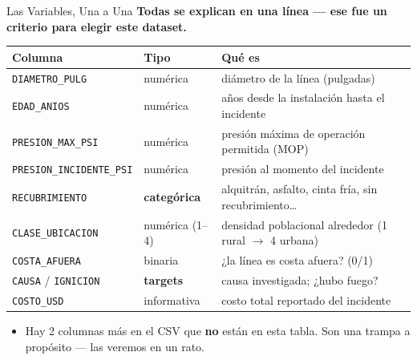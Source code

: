 \documentclass[aspectratio=169, 11pt]{beamer}
\begin{document}
\begin{frame}[shrink=10]{Las Variables, Una a Una}
  \vspace{-4pt}
  {\small\color{arcaDark}\bfseries
    Todas se explican en una línea --- ese fue un criterio para elegir este dataset.}

  \vspace{6pt}
  {\footnotesize
  \begin{tabular}{@{}llp{7.2cm}@{}}
    \toprule
    {\color{arcaDark}\bfseries Columna} & {\color{arcaDark}\bfseries Tipo} &
    {\color{arcaDark}\bfseries Qué es} \\
    \midrule
    \texttt{DIAMETRO\_PULG} & numérica & diámetro de la línea (pulgadas) \\
    \texttt{EDAD\_ANIOS} & numérica & años desde la instalación hasta el incidente \\
    \texttt{PRESION\_MAX\_PSI} & numérica & presión máxima de operación permitida (MOP) \\
    \texttt{PRESION\_INCIDENTE\_PSI} & numérica & presión al momento del incidente \\
    \texttt{RECUBRIMIENTO} & \textbf{categórica} & alquitrán, asfalto, cinta fría, sin recubrimiento\ldots \\
    \texttt{CLASE\_UBICACION} & numérica (1--4) & densidad poblacional alrededor (1 rural \(\to\) 4 urbana) \\
    \texttt{COSTA\_AFUERA} & binaria & ¿la línea es costa afuera? (0/1) \\
    \texttt{CAUSA} / \texttt{IGNICION} & \textbf{targets} & causa investigada; ¿hubo fuego? \\
    \texttt{COSTO\_USD} & informativa & costo total reportado del incidente \\
    \bottomrule
  \end{tabular}
  }

  \vspace{6pt}
  {\scriptsize\color{textMuted}
  \begin{itemize}\setlength{\itemsep}{2pt}
    \item[{\color{arcaRed}\scriptsize\faExclamationTriangle}]
      Hay 2 columnas más en el CSV que \textbf{no} están en esta tabla.
      Son una trampa a propósito --- las veremos en un rato.
  \end{itemize}
  }
\end{frame}
\end{document}
